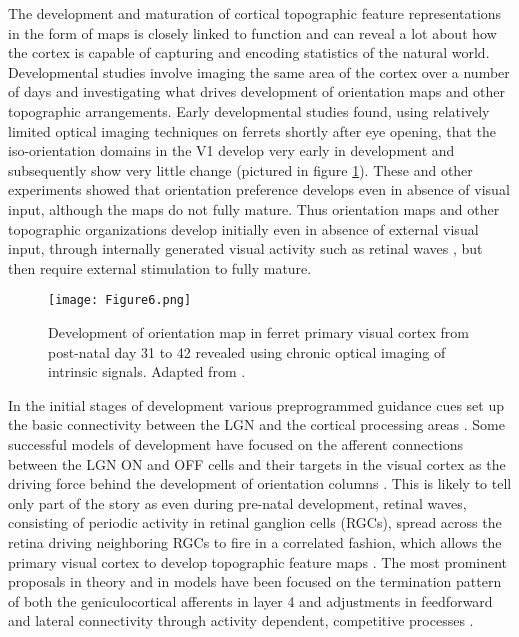 The development and maturation of cortical topographic feature
representations in the form of maps is closely linked to function and
can reveal a lot about how the cortex is capable of capturing and
encoding statistics of the natural world. Developmental studies
involve imaging the same area of the cortex over a number of days and
investigating what drives development of orientation maps and other
topographic arrangements. Early developmental studies found, using
relatively limited optical imaging techniques on ferrets shortly after
eye opening, that the iso-orientation domains in the V1 develop very
early in development and subsequently show very little change
\citep{Chapman1996} (pictured in figure \ref{RFMapDevelopment}). These
and other experiments \citep{White2007} showed that orientation
preference develops even in absence of visual input, although the maps
do not fully mature. Thus orientation maps and other topographic
organizations develop initially even in absence of external visual
input, through internally generated visual activity such as retinal
waves \citep{Cang2005}, but then require external stimulation to fully
mature.

\begin{figure}
	\centering \texttt{[image: Figure6.png]}
	\caption[Development of an orientation map in ferret V1. Adapted
      from \cite{Chapman1996}.]{Development of orientation map in
      ferret primary visual cortex from post-natal day 31 to 42
      revealed using chronic optical imaging of intrinsic
      signals. Adapted from \cite{Chapman1996}.}
	\label{RFMapDevelopment}
\end{figure}

In the initial stages of development various preprogrammed guidance
cues set up the basic connectivity between the LGN and the cortical
processing areas \citep{Huberman2008}. Some successful models of
development have focused on the afferent connections between the LGN
ON and OFF cells and their targets in the visual cortex as the driving
force behind the development of orientation columns
\citep{Jin2011}. This is likely to tell only part of the story as even
during pre-natal development, retinal waves, consisting of periodic
activity in retinal ganglion cells (RGCs), spread across the retina
driving neighboring RGCs to fire in a correlated fashion, which allows
the primary visual cortex to develop topographic feature maps
\citep{Firth2005}. The most prominent proposals in theory and in
models have been focused on the termination pattern of both the
geniculocortical afferents in layer 4 \citep{Katz2000,Ringach2007} and
adjustments in feedforward and lateral connectivity through activity
dependent, competitive processes \citep{Bednar2003}.

